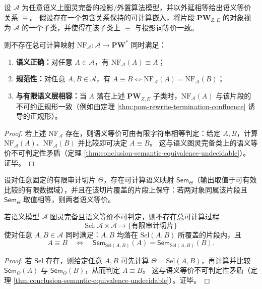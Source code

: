 \begin{theorem}[语义图灵完备类上不存在可计算的实现无关规范代表]\label{thm:pom-no-global-computable-canonical-representative}
设 \(\mathcal A\) 为任意语义上图灵完备的投影/外置算法模型，并以外延相等给出语义等价关系 \(\equiv\)。
假设存在一个包含关系保持的可计算嵌入，将片段 \(\mathbf{PW}_{Z,E}\) 的对象视为 \(\mathcal A\) 的一个子类，并使得在该子类上 \(\equiv\) 与投影词等价一致。
\par
则不存在总可计算映射 \(\mathrm{NF}_{\mathcal A}:\mathcal A\to \mathbf{PW}^\ast\) 同时满足：
\begin{enumerate}
  \item \textbf{语义正确：}对任意 \(A\in\mathcal A\)，有 \(\mathrm{NF}_{\mathcal A}(A)\equiv A\)；
  \item \textbf{规范性：}对任意 \(A,B\in\mathcal A\)，有 \(A\equiv B\iff \mathrm{NF}_{\mathcal A}(A)=\mathrm{NF}_{\mathcal A}(B)\)；
  \item \textbf{与有限语义层相容：}当 \(A\) 落在上述 \(\mathbf{PW}_{Z,E}\) 子类时，\(\mathrm{NF}_{\mathcal A}(A)\) 与该片段的不可约正规形一致（例如由定理 \ref{thm:pom-rewrite-termination-confluence} 诱导的正规形）。
\end{enumerate}
\end{theorem}
\begin{proof}
若上述 \(\mathrm{NF}_{\mathcal A}\) 存在，则语义等价可由有限字符串相等判定：给定 \(A,B\)，计算 \(\mathrm{NF}_{\mathcal A}(A)\)、\(\mathrm{NF}_{\mathcal A}(B)\) 并比较即可决定 \(A\equiv B\)。
这与语义图灵完备类上的语义等价不可判定性矛盾（定理 \ref{thm:conclusion-semantic-equivalence-undecidable}）。
证毕。
\end{proof}

\begin{theorem}\label{thm:pom-no-computable-sufficient-slice-selector}
设对任意固定的有限审计切片 \(\Theta\)，存在可计算语义映射 \(\mathsf{Sem}_\Theta\)（输出取值于可有效比较的有限数据域），并且在该切片覆盖的片段上保守：若两对象同属该片段且 \(\mathsf{Sem}_\Theta\) 取值相等，则两者语义等价。
\par
若语义模型 \(\mathcal A\) 图灵完备且语义等价不可判定，则不存在总可计算过程
\[
\mathrm{Sel}:\mathcal A\times\mathcal A\to \{\text{有限审计切片}\}
\]
使对任意 \(A,B\in\mathcal A\) 同时满足：\(A,B\) 均落在 \(\mathrm{Sel}(A,B)\) 所覆盖的片段内，且
\[
A\equiv B\quad\Longleftrightarrow\quad
\mathsf{Sem}_{\mathrm{Sel}(A,B)}(A)=\mathsf{Sem}_{\mathrm{Sel}(A,B)}(B).
\]
\end{theorem}
\begin{proof}
若 \(\mathrm{Sel}\) 存在，则给定任意 \(A,B\) 可先计算 \(\Theta=\mathrm{Sel}(A,B)\)，再计算并比较 \(\mathsf{Sem}_\Theta(A)\) 与 \(\mathsf{Sem}_\Theta(B)\)，从而判定 \(A\equiv B\)。
这与语义等价不可判定性矛盾（定理 \ref{thm:conclusion-semantic-equivalence-undecidable}）。证毕。
\end{proof}

